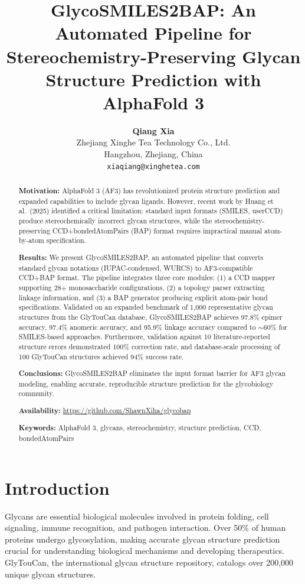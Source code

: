 \documentclass[11pt,a4paper]{article}
\title{\textbf{GlycoSMILES2BAP: An Automated Pipeline for Stereochemistry-Preserving Glycan Structure Prediction with AlphaFold 3}}
\author{
\textbf{Qiang Xia}\\
Zhejiang Xinghe Tea Technology Co., Ltd.\\
Hangzhou, Zhejiang, China\\
\texttt{xiaqiang@xinghetea.com}
}
\date{}
\begin{document}
\maketitle

\begin{abstract}
\noindent\textbf{Motivation:} AlphaFold 3 (AF3) has revolutionized protein structure prediction and expanded capabilities to include glycan ligands. However, recent work by Huang et al.\ (2025) identified a critical limitation: standard input formats (SMILES, userCCD) produce stereochemically incorrect glycan structures, while the stereochemistry-preserving CCD+bondedAtomPairs (BAP) format requires impractical manual atom-by-atom specification.

\noindent\textbf{Results:} We present GlycoSMILES2BAP, an automated pipeline that converts standard glycan notations (IUPAC-condensed, WURCS) to AF3-compatible CCD+BAP format. The pipeline integrates three core modules: (1) a CCD mapper supporting 28+ monosaccharide configurations, (2) a topology parser extracting linkage information, and (3) a BAP generator producing explicit atom-pair bond specifications. Validated on an expanded benchmark of 1,000 representative glycan structures from the GlyTouCan database, GlycoSMILES2BAP achieves 97.8\% epimer accuracy, 97.4\% anomeric accuracy, and 95.9\% linkage accuracy compared to ${\sim}60\%$ for SMILES-based approaches. Furthermore, validation against 10 literature-reported structure errors demonstrated 100\% correction rate, and database-scale processing of 100 GlyTouCan structures achieved 94\% success rate.

\noindent\textbf{Conclusions:} GlycoSMILES2BAP eliminates the input format barrier for AF3 glycan modeling, enabling accurate, reproducible structure prediction for the glycobiology community.

\noindent\textbf{Availability:} \url{https://github.com/ShawnXiha/glycobap}

\noindent\textbf{Keywords:} AlphaFold 3, glycans, stereochemistry, structure prediction, CCD, bondedAtomPairs
\end{abstract}

\section{Introduction}

Glycans are essential biological molecules involved in protein folding, cell signaling, immune recognition, and pathogen interaction. Over 50\% of human proteins undergo glycosylation, making accurate glycan structure prediction crucial for understanding biological mechanisms and developing therapeutics. GlyTouCan, the international glycan structure repository, catalogs over 200,000 unique glycan structures.
\end{document}
